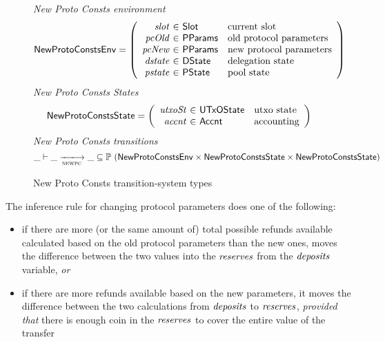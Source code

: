 \begin{figure}[htb]
  \emph{New Proto Consts environment}
  \begin{equation*}
    \NewProtoConstsEnv =
    \left(
      \begin{array}{r@{~\in~}ll}
        \var{slot} & \Slot & \text{current slot}\\
        \var{pcOld} & \PParams & \text{old protocol parameters}\\
        \var{pcNew} & \PParams & \text{new protocol parameters}\\
        \var{dstate} & \DState & \text{delegation state}\\
        \var{pstate} & \PState & \text{pool state}\\
      \end{array}
    \right)
  \end{equation*}
  \emph{New Proto Consts States}
  \begin{equation*}
    \NewProtoConstsState =
    \left(
      \begin{array}{r@{~\in~}ll}
        \var{utxoSt} & \UTxOState & \text{utxo state}\\
        \var{accnt} & \Accnt & \text{accounting}\\
      \end{array}
    \right)
  \end{equation*}
  \emph{New Proto Consts transitions}
  \begin{equation*}
    \_ \vdash
    \var{\_} \trans{newpc}{} \var{\_}
    \subseteq \powerset (\NewProtoConstsEnv \times
    \NewProtoConstsState \times \NewProtoConstsState)
  \end{equation*}
  \caption{New Proto Consts transition-system types}
  \label{fig:ts-types:new-proto-consts}
\end{figure}


The inference rule for changing protocol parameters does one of the following:

\begin{itemize}
\item if there are more (or the same amount of) total possible refunds
available calculated based on the old protocol parameters than the new ones,
moves the difference between the two values into the $\mathit{reserves}$
from the $\mathit{deposits}$ variable, \textit{or}

\item if there are more refunds available based on the new parameters, it moves
the difference between the two calculations from $\mathit{deposits}$
to $\mathit{reserves}$, \textit{provided that} there is enough coin in the
$\mathit{reserves}$ to cover the entire value of the transfer
\end{itemize}


